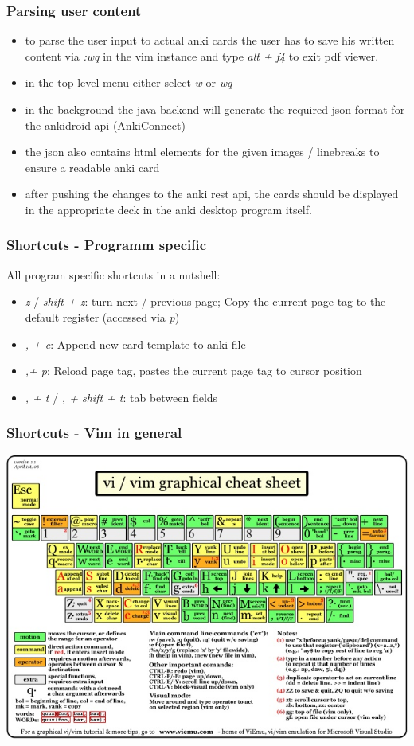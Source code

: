\documentclass[xcolor=dvipanames]{beamer}
\begin{document}
	\begin{frame}
		\frametitle{Parsing user content}
		\begin{itemize}
			\item to parse the user input to actual anki cards the user has to save his written content via \emph{:wq} in the vim instance and type \emph{alt + f4} to exit pdf viewer. 
			\item in the top level menu either select \emph{w} or \emph{wq}
			\item in the background the java backend will generate the required json format for the ankidroid api (AnkiConnect)
			\item the json also contains html elements for the given images / linebreaks to ensure a readable anki card 
			\item after pushing the changes to the anki rest api, the cards should be displayed in the appropriate deck in the anki desktop program itself.
		\end{itemize}
	\end{frame}
	
	\begin{frame}
		\frametitle{Shortcuts - Programm specific}
		All program specific shortcuts in a nutshell: 
		\begin{itemize}
			\item \emph{z} / \emph{shift + z}: turn next / previous page; Copy the current page tag to the default register (accessed via \emph{p})
			\item \emph{, + c}: Append new card template to anki file
			\item \emph{,+ p}: Reload page tag, pastes the current page tag to cursor position
			\item \emph{, + t} / \emph{, + shift + t}: tab between fields
		\end{itemize}
	\end{frame}
	
	\begin{frame}
		\frametitle{Shortcuts - Vim in general}
		\begin{center}
			\includegraphics[scale=.48]{./img/vim-cheat-sheet.jpg}
		\end{center}
	\end{frame}
		
	
	
\end{document}
